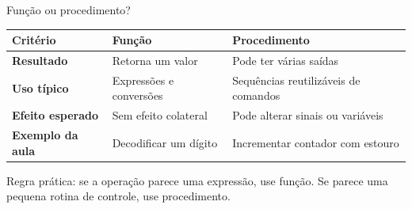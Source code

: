 \documentclass[aspectratio=169,11pt]{beamer}
\begin{document}
\begin{frame}{Função ou procedimento?}
    \begin{table}
        \centering
        \small
        \renewcommand{\arraystretch}{1.35}
        \setlength{\tabcolsep}{8pt}
        \begin{tabular}{>{\bfseries}p{} p{} p{}}
            \toprule
            Critério & Função & Procedimento \\
            \midrule
            Resultado & Retorna um valor & Pode ter várias saídas \\
            Uso típico & Expressões e conversões & Sequências reutilizáveis de comandos \\
            Efeito esperado & Sem efeito colateral & Pode alterar sinais ou variáveis \\
            Exemplo da aula & Decodificar um dígito & Incrementar contador com estouro \\
            \bottomrule
        \end{tabular}
    \end{table}

    \vspace{0.5em}
    Regra prática: se a operação parece uma expressão, use função. Se parece uma pequena rotina de controle, use procedimento.

\end{frame}
\end{document}
